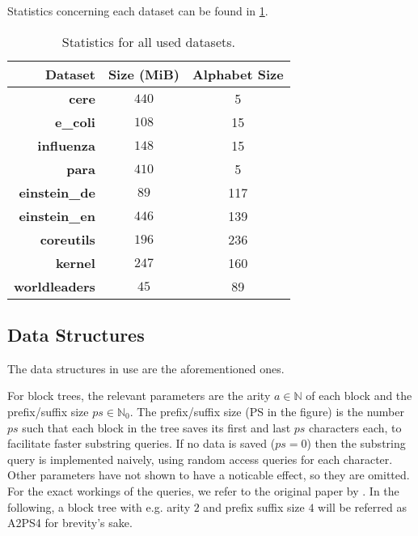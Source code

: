 \documentclass{scrartcl}
\begin{document}
Statistics concerning each dataset can be found in \cref{tab:03:datastats}.

\begin{table}
	\caption{Statistics for all used datasets.}
	\label{tab:03:datastats}
	\centering
	\begin{tabular}[c]{r|c|c}
		\textbf{Dataset}      & \textbf{Size (MiB)} & \textbf{Alphabet Size} \\\hline\hline
		\textbf{cere}         & $440$               & 5                      \\
		\textbf{e\_coli}      & $108$               & 15                     \\
		\textbf{influenza}    & $148$               & 15                     \\
		\textbf{para}         & $410$               & 5                      \\
		\textbf{einstein\_de} & $89$                & 117                    \\
		\textbf{einstein\_en} & $446$               & 139                    \\
		\textbf{coreutils}    & $196$               & 236                    \\
		\textbf{kernel}       & $247$               & 160                    \\
		\textbf{worldleaders} & $45$                & 89                     \\
	\end{tabular}
\end{table}

\subsection{Data Structures}

The data structures in use are the aforementioned ones.

For block trees, the relevant parameters are the arity $a \in \mathbb{N}$ of each block and the prefix/suffix size $ps \in \mathbb{N}_0$.
The prefix/suffix size (PS in the figure) is the number $ps$ such that each block in the tree saves its first and last $ps$ characters each, to facilitate faster substring queries.
If no data is saved ($ps = 0$) then the substring query is implemented naively, using random access queries for each character.
Other parameters have not shown to have a noticable effect, so they are omitted.
For the exact workings of the queries, we refer to the original paper by \citeauthor{belazzougui_block_2021} \cite{belazzougui_block_2021}.
In the following, a block tree with e.g. arity $2$ and prefix suffix size $4$ will be referred as A2PS4 for brevity's sake.
\end{document}

